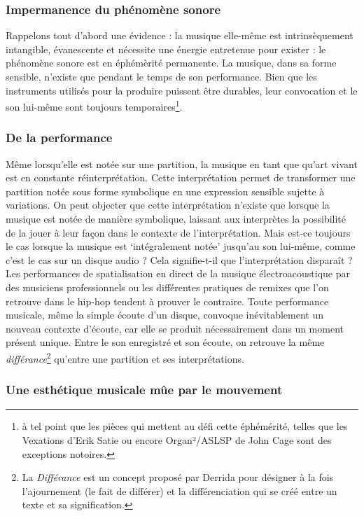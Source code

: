 \subsubsection{Impermanence du phénomène sonore}
\noindent Rappelons tout d'abord une évidence : la musique elle-même est intrinsèquement intangible, évanescente et nécessite une énergie entretenue pour exister : le phénomène sonore est en éphémèrité permanente. La musique, dans sa forme sensible, n'existe que pendant le temps de son performance. Bien que les instruments utilisés pour la produire puissent être durables, leur convocation et le son lui-même sont toujours temporaires\footnote{à tel point que les pièces qui mettent au défi cette éphémérité, telles que les Vexations d'Erik Satie ou encore Organ²/ASLSP de John Cage sont des exceptions notoires.}.

\subsubsection{De la performance}

\noindent Même lorsqu'elle est notée sur une partition, la musique en tant que qu'art vivant est en constante réinterprétation. Cette interprétation permet de transformer une partition notée sous forme symbolique en une expression sensible sujette à variations. On peut objecter que cette interprétation n'existe que lorsque la musique est notée de manière symbolique, laissant aux interprètes la possibilité de la jouer à leur façon dans le contexte de l'interprétation. Mais est-ce toujours le cas lorsque la musique est `intégralement notée' jusqu'au son lui-même, comme c'est le cas sur un disque audio ? Cela signifie-t-il que l'interprétation disparaît ? Les performances de spatialisation en direct de la musique électroacoustique par des musiciens professionnels ou les différentes pratiques de remixes que l'on retrouve dans le hip-hop tendent à prouver le contraire. Toute performance musicale, même la simple écoute d'un disque, convoque inévitablement un nouveau contexte d'écoute, car elle se produit nécessairement dans un moment présent unique. Entre le son enregistré et son écoute, on retrouve la même \textit{différance}\footnote{La \textit{Différance} est un concept proposé par Derrida \cite{derrida_lecriture_2014} pour désigner à la fois l'ajournement (le fait de différer) et la différenciation qui se créé entre un texte et sa signification.} qu'entre une partition et ses interprétations.

\subsubsection{Une esthétique musicale mûe par le mouvement}


